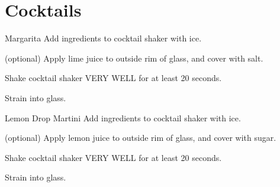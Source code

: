 \documentclass[]{article}
\begin{document}
\newpage

\section{Cocktails}

\begin{recipe}{Margarita}{}{}
  Add ingredients to cocktail shaker with ice.

  (optional) Apply lime juice to outside rim of glass, and cover with salt.

  \newstep
  Shake cocktail shaker VERY WELL for at least 20 seconds.

  \newstep
  Strain into glass.
\end{recipe}

\begin{recipe}{Lemon Drop Martini}{}{}
  Add ingredients to cocktail shaker with ice.

  (optional) Apply lemon juice to outside rim of glass, and cover with sugar.

  \newstep
  Shake cocktail shaker VERY WELL for at least 20 seconds.

  \newstep
  Strain into glass.
\end{recipe}
\end{document}
